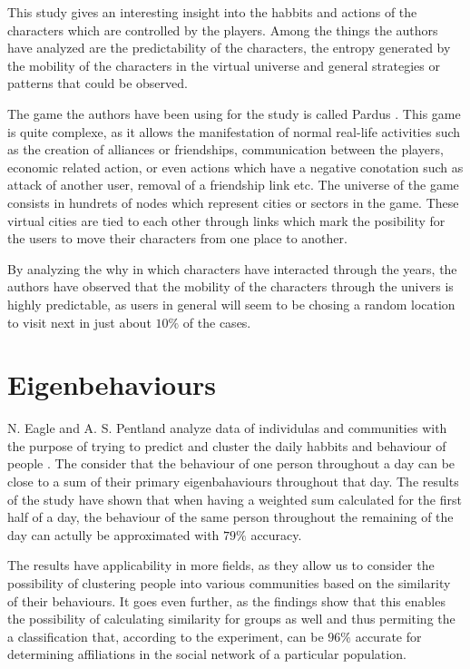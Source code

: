 This study gives an interesting insight into the habbits and actions of the
characters which are controlled by the players. Among the things the authors
have analyzed are the predictability of the characters, the entropy generated by
the mobility of the characters in the virtual universe and general strategies or
patterns that could be observed.

The game the authors have been using for the study is called Pardus
\cite{Pardus}. This game is quite complexe, as it allows the manifestation of
normal real-life activities such as the creation of alliances or friendships,
communication between the players, economic related action, or even actions
which have a negative conotation such as attack of another user, removal of a
friendship link etc. The universe of the game consists in hundrets of nodes
which represent cities or sectors in the game. These virtual cities are tied to
each other through links which mark the posibility for the users to move their
characters from one place to another.

By analyzing the why in which characters have interacted through the years, the
authors have observed that the mobility of the characters through the univers is
highly predictable, as users in general will seem to be chosing a random
location to visit next in just about $10\%$ of the cases.

\section{Eigenbehaviours}
N. Eagle and A. S. Pentland analyze data of individulas and communities with the
purpose of trying to predict and cluster the daily habbits and behaviour of
people \cite{Eagle09}. The consider that the behaviour of one person throughout a
day can be close to a sum of their primary eigenbahaviours throughout that day.
The results of the study have shown that when having a weighted sum calculated
for the first half of a day, the behaviour of the same person throughout the
remaining of the day can actully be approximated with $79\%$ accuracy.

The results have applicability in more fields, as they allow us to consider the
possibility of clustering people into various communities based on the
similarity of their behaviours. It goes even further, as the findings show that
this enables the possibility of calculating similarity for groups as well and
thus permiting the a classification that, according to the experiment, can be
$96\%$ accurate for determining affiliations in the social network of a
particular population.

